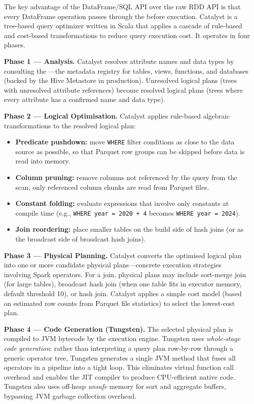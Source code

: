 The key advantage of the DataFrame/SQL API over the raw RDD API is that
every DataFrame operation passes through the 
before execution. Catalyst is a tree-based query optimizer written in
Scala that applies a cascade of rule-based and cost-based transformations
to reduce query execution cost. It operates in four phases.

\textbf{Phase 1 --- Analysis.} Catalyst resolves attribute names and
data types by consulting the ---the metadata registry
for tables, views, functions, and databases (backed by the Hive Metastore
in production). Unresolved logical plans (trees with unresolved attribute
references) become resolved logical plans (trees where every attribute
has a confirmed name and data type).

\textbf{Phase 2 --- Logical Optimisation.} Catalyst applies rule-based
algebraic transformations to the resolved logical plan:
\begin{itemize}
  \item \textbf{Predicate pushdown:} move \texttt{WHERE} filter conditions
        as close to the data source as possible, so that Parquet row
        groups can be skipped before data is read into memory.
  \item \textbf{Column pruning:} remove columns not referenced by the
        query from the scan; only referenced column chunks are read
        from Parquet files.
  \item \textbf{Constant folding:} evaluate expressions that involve
        only constants at compile time (e.g., \texttt{WHERE year = 2020
        + 4} becomes \texttt{WHERE year = 2024}).
  \item \textbf{Join reordering:} place smaller tables on the build side
        of hash joins (or as the broadcast side of broadcast hash joins).
\end{itemize}

\textbf{Phase 3 --- Physical Planning.} Catalyst converts the optimised
logical plan into one or more candidate physical plans---concrete
execution strategies involving Spark operators. For a join, physical
plans may include sort-merge join (for large tables), broadcast hash join
(when one table fits in executor memory, default threshold 10\MB), or
hash join. Catalyst applies a simple cost model (based on estimated row
counts from Parquet file statistics) to select the lowest-cost plan.

\textbf{Phase 4 --- Code Generation (Tungsten).} The selected physical
plan is compiled to JVM bytecode by the  execution engine.
Tungsten uses \emph{whole-stage code generation}: rather than interpreting
a query plan row-by-row through a generic operator tree, Tungsten
generates a single JVM method that fuses all operators in a pipeline into
a tight loop. This eliminates virtual function call overhead and enables
the JIT compiler to produce CPU-efficient native code. Tungsten also uses
off-heap \emph{unsafe} memory for sort and aggregate buffers, bypassing
JVM garbage collection overhead.


